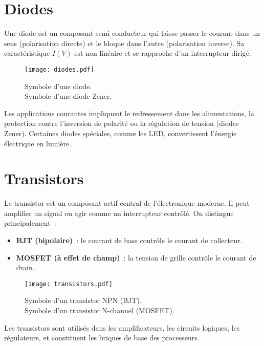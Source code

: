 \section{Diodes} \label{sec:diodes}
Une diode est un composant semi-conducteur qui laisse passer le courant dans un sens (polarisation directe) et le bloque dans l'autre (polarisation inverse). Sa caract\'eristique \(I(V)\) est non lin\'eaire et se rapproche d'un interrupteur dirig\'e.
\begin{figure}[H]
    \centering
    \texttt{[image: diodes.pdf]}
    \caption{\newline
         Symbole d'une diode.\\
         Symbole d'une diode Zener.
    }
\end{figure}
Les applications courantes impliquent le redressement dans les alimentations, la protection contre l'inversion de polarit\'e ou la r\'egulation de tension (diodes Zener). Certaines diodes sp\'eciales, comme les LED, convertissent l'\'energie \'electrique en lumi\`ere.

\section{Transistors} \label{sec:transistors}
Le transistor est un composant actif central de l'\'electronique moderne. Il peut amplifier un signal ou agir comme un interrupteur contrôl\'e. On distingue principalement~:
\begin{itemize}
  \item \textbf{BJT (bipolaire)}~: le courant de base contrôle le courant de collecteur.
  \item \textbf{MOSFET (à effet de champ)}~: la tension de grille contrôle le courant de drain.
\end{itemize}
\begin{figure}[H]
    \centering
    \texttt{[image: transistors.pdf]}
    \caption{\centering\newline
         Symbole d'un transistor NPN (BJT).\\
         Symbole d'un transistor N-channel (MOSFET).
    }
\end{figure}
Les transistors sont utilis\'es dans les amplificateurs, les circuits logiques, les r\'egulateurs, et constituent les briques de base des processeurs.
